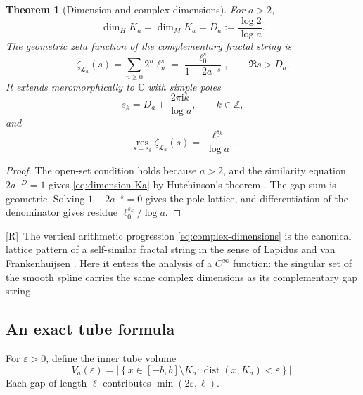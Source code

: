 \documentclass[11pt,oneside]{article}
\newtheorem{theorem}{Theorem}[section]
\theoremstyle{definition}
\theoremstyle{remark}
\newcommand{\C}{\mathbb C}
\newcommand{\Z}{\mathbb Z}
\newcommand{\ii}{\mathrm i}
\newcommand{\dist}{\operatorname{dist}}
\newcommand{\eps}{\varepsilon}
\newcommand{\Rmark}{\textcolor{sourceblue}{\textsf{[R]}}}
\begin{document}
\begin{theorem}[Dimension and complex dimensions]
\label{thm:complex-dimensions}
For $a>2$,
\begin{equation}
 \dim_HK_a=\dim_MK_a=D_a:=\frac{\log2}{\log a}.
 \label{eq:dimension-Ka}
\end{equation}
The geometric zeta function of the complementary fractal string is
\begin{equation}
 \zeta_{\mathcal L_a}(s)
 =\sum_{n\ge0}2^n\ell_n^s
 =\frac{\ell_0^s}{1-2a^{-s}},
 \qquad \Re s>D_a.
 \label{eq:fractal-zeta}
\end{equation}
It extends meromorphically to $\C$ with simple poles
\begin{equation}
 s_k=D_a+\frac{2\pi\ii k}{\log a},\qquad k\in\Z,
 \label{eq:complex-dimensions}
\end{equation}
and
\begin{equation}
 \operatorname*{res}_{s=s_k}\zeta_{\mathcal L_a}(s)
 =\frac{\ell_0^{s_k}}{\log a}.
 \label{eq:zeta-residue}
\end{equation}
\end{theorem}

\begin{proof}
The open-set condition holds because $a>2$, and the similarity equation
$2a^{-D}=1$ gives \eqref{eq:dimension-Ka} by Hutchinson's theorem
\cite{hutchinson1981}.  The gap sum is geometric.  Solving $1-2a^{-s}=0$ gives the pole
lattice, and differentiation of the denominator gives residue $\ell_0^{s_k}/\log a$.
\end{proof}

\Rmark\ The vertical arithmetic progression \eqref{eq:complex-dimensions} is the canonical
lattice pattern of a self-similar fractal string in the sense of Lapidus and van
Frankenhuijsen \cite{lapidus2003,lapidusbook}.  Here it enters the analysis of a $C^\infty$
function: the singular set of the smooth spline carries the same complex dimensions as its
complementary gap string.

\subsection{An exact tube formula}

For $\eps>0$, define the inner tube volume
\begin{equation}
 V_a(\eps)=
 \left|\left\{x\in[-b,b]\setminus K_a:\dist(x,K_a)<\eps\right\}\right|.
 \label{eq:tube-def}
\end{equation}
Each gap of length $\ell$ contributes $\min(2\eps,\ell)$.
\end{document}
